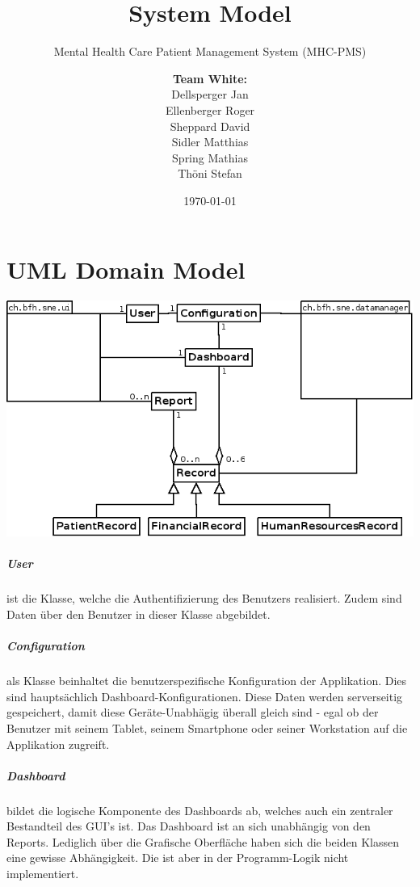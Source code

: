 \documentclass[a4paper]{scrreprt}
\title{System Model}
\subtitle{Mental Health Care Patient Management System (MHC-PMS)}
\author{
\begin{tabular}{l}
\normalfont\bfseries{Team White:}\\
Dellsperger Jan\\
Ellenberger Roger\\
Sheppard David\\
Sidler Matthias\\
Spring Mathias\\
Thöni Stefan
\end{tabular}
}
\date{\today}
\begin{document}
\begin{titlepage}
	\maketitle
\end{titlepage}

\chapter{UML Domain Model}

\includegraphics[width=1\textwidth]{./class-diagram.png}

\paragraph{User} ist die Klasse, welche die Authentifizierung des Benutzers realisiert. Zudem sind  Daten über den Benutzer in dieser Klasse abgebildet.

\paragraph{Configuration} als Klasse beinhaltet die benutzerspezifische Konfiguration der Applikation. Dies sind hauptsächlich Dashboard-Konfigurationen. Diese Daten werden serverseitig gespeichert, damit diese Geräte-Unabhägig überall gleich sind - egal ob der Benutzer mit seinem Tablet, seinem Smartphone oder seiner Workstation auf die Applikation zugreift.

\paragraph{Dashboard} bildet die logische Komponente des Dashboards ab, welches auch ein zentraler Bestandteil des GUI's ist. Das Dashboard ist an sich unabhängig von den Reports. Lediglich über die Grafische Oberfläche haben sich die beiden Klassen eine gewisse Abhängigkeit. Die ist aber in der Programm-Logik nicht implementiert.
\end{document}

